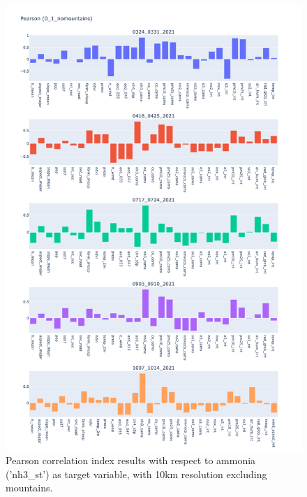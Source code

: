 \begin{figure}[H]
    \centering
    \includegraphics[scale=0.35]{images/tests/0_1_nomountainsnh3_st_pearson.png}
    \caption{Pearson correlation index results with respect to ammonia ('nh3\_st') as target variable, with 10km resolution excluding mountains.}
    \label{fig:overview}
\end{figure}
